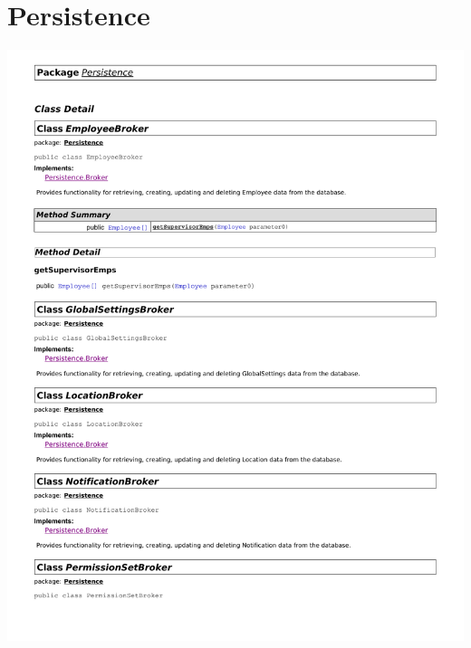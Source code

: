 \documentclass[letterpaper,12pt]{report}
\begin{document}
\section{Persistence}
\includegraphics[scale=0.9,trim=10mm 30mm 25mm 15mm]{externals/dp1.pdf}
\newpage
\end{document}
